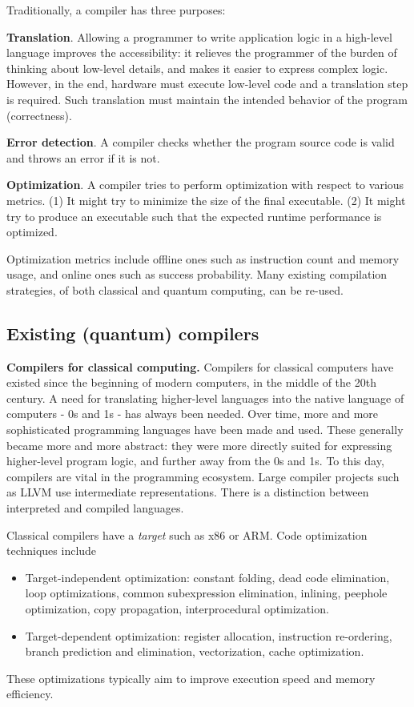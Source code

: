 Traditionally, a compiler has three purposes:

\textbf{Translation}.
Allowing a programmer to write application logic in a high-level language improves the accessibility:
it relieves the programmer of the burden of thinking about low-level details, and makes it easier to express complex logic.
However, in the end, hardware must execute low-level code and a translation step is required.
Such translation must maintain the intended behavior of the program (correctness).

\textbf{Error detection}.
A compiler checks whether the program source code is valid and throws an error if it is not.

\textbf{Optimization}.
A compiler tries to perform optimization with respect to various metrics.
(1) It might try to minimize the size of the final executable.
(2) It might try to produce an executable such that the expected runtime performance is optimized.



Optimization metrics include offline ones such as instruction count and memory usage, and online ones such as success probability.
Many existing compilation strategies, of both classical and quantum computing, can be re-used.


\subsection{Existing (quantum) compilers}

\textbf{Compilers for classical computing.}
Compilers for classical computers have existed since the beginning of modern computers, in the middle of the 20th century.
A need for translating higher-level languages into the native language of computers - 0s and 1s - has always been needed.
Over time, more and more sophisticated programming languages have been made and used.
These generally became more and more abstract: they were more directly suited for expressing higher-level program logic, and further away from the 0s and 1s.
To this day, compilers are vital in the programming ecosystem.
Large compiler projects such as LLVM use intermediate representations.
There is a distinction between interpreted and compiled languages.

Classical compilers have a \textit{target} such as x86 or ARM.
Code optimization techniques include
\begin{itemize}
  \item Target-independent optimization: constant folding, dead code elimination, loop optimizations, common subexpression elimination, inlining, peephole optimization, copy propagation, interprocedural optimization.
  \item Target-dependent optimization: register allocation, instruction re-ordering, branch prediction and elimination, vectorization, cache optimization.
\end{itemize}
These optimizations typically aim to improve execution speed and memory efficiency.

